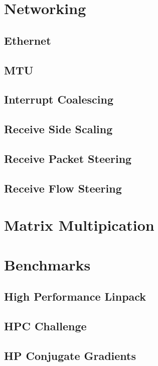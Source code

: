 \documentclass{report}
\begin{document}
%
%
\section{Networking}

\subsection{Ethernet}

\subsection{MTU}

\subsection{Interrupt Coalescing}

\subsection{Receive Side Scaling}

\subsection{Receive Packet Steering}

\subsection{Receive Flow Steering}


%
%
\section{Matrix Multipication}


%
%
\section{Benchmarks}

\subsection{High Performance Linpack}

\subsection{HPC Challenge}

\subsection{HP Conjugate Gradients}
\end{document}
